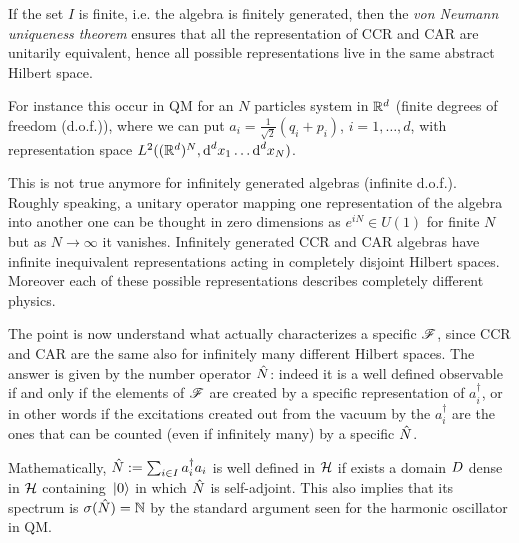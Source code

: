 \documentclass[../main/main.tex]{subfiles}
\begin{document}
If the set $I$ is finite, i.e. the algebra is finitely generated, then the \emph{von Neumann uniqueness theorem} ensures that all the representation of CCR and CAR are unitarily equivalent, hence all possible representations live in the same abstract Hilbert space. 

For instance this occur in QM for an $N$ particles system in $\mathbb{R}^d$ (finite degrees of freedom (d.o.f.)), where we can put $a_i=\frac1{\sqrt2}(q_i+p_i)$, $i=1,\dots,d$, with representation space $L^2((\mathbb{R}^d)^N,\textnormal{d}^dx_1\dots\textnormal{d}^dx_N)$. 

This is not true anymore for infinitely generated algebras (infinite d.o.f.). Roughly speaking, a unitary operator mapping one representation of the algebra into another one can be thought in zero dimensions as $e^{iN}\in U(1)$ for finite $N$ but as $N\to\infty$ it vanishes. Infinitely generated CCR and CAR algebras have infinite inequivalent representations acting in completely disjoint Hilbert spaces. Moreover each of these possible representations describes completely different physics.

The point is now understand what actually characterizes a specific $\mathscr F$, since CCR and CAR are the same also for infinitely many different Hilbert spaces. The answer is given by the number operator $\hat{N}$: indeed it is a well defined observable if and only if the elements of $\mathscr F$ are created by a specific representation of $a_i^\dagger$, or in other words if the excitations created out from the vacuum by the $a_i^\dagger$ are the ones that can be counted (even if infinitely many) by a specific $\hat{N}$. 

Mathematically, $\hat{N}:=\sum_{i\in I}a_i^\dagger a_i$ is well defined in $\mathcal H$ if exists a domain $D$ dense in $\mathcal H$ containing $\,\vert0\rangle$ in which $\hat{N}$ is self-adjoint. This also implies that its spectrum is $\sigma(\hat{N})=\mathbb{N}$ by the standard argument seen for the harmonic oscillator in QM. 
\end{document}
